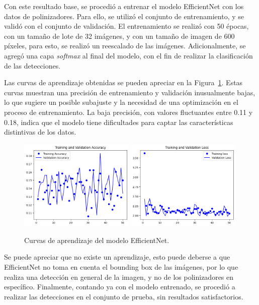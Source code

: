 Con este resultado base, se procedió a entrenar el modelo EfficientNet con los datos de polinizadores. Para ello, se utilizó el conjunto de entrenamiento, y se validó con el conjunto de validación. El entrenamiento se realizó con 50 épocas, con un tamaño de lote de 32 imágenes, y con un tamaño de imagen de 600 píxeles, para esto, se realizó un reescalado de las imágenes. Adicionalmente, se agregó una capa \textit{softmax} al final del modelo, con el fin de realizar la clasificación de las detecciones.

Las curvas de aprendizaje obtenidas se pueden apreciar en la Figura~\ref{fig:curvas_aprendizaje_efficientnet}. Estas curvas muestran una precisión de entrenamiento y validación inusualmente bajas, lo que sugiere un posible subajuste y la necesidad de una optimización en el proceso de entrenamiento. La baja precisión, con valores fluctuantes entre 0.11 y 0.18, indica que el modelo tiene dificultades para captar las características distintivas de los datos.

\begin{figure}[H]
    \centering
    \includegraphics[width=0.49\textwidth]{Figuras/curvas_aprendizaje_efficientnet_1.png}
    \includegraphics[width=0.49\textwidth]{Figuras/curvas_aprendizaje_efficientnet_2.png}
    \caption{Curvas de aprendizaje del modelo EfficientNet.}
    \label{fig:curvas_aprendizaje_efficientnet}
\end{figure}

Se puede apreciar que no existe un aprendizaje, esto puede deberse a que EfficientNet no toma en cuenta el bounding box de las imágenes, por lo que realiza una detección en general de la imagen, y no de los polinizadores en específico. Finalmente, contando ya con el modelo entrenado, se procedió a realizar las detecciones en el conjunto de prueba, sin resultados satisfactorios.

